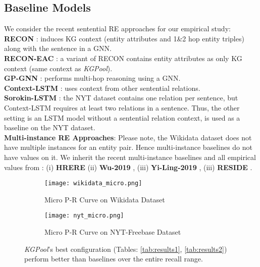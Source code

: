 \documentclass[11pt,a4paper]{article}
\begin{document}
\subsection{Baseline Models} \label{sec:baseline}
We consider the recent sentential RE approaches for our empirical study:\\
\textbf{RECON} \cite{bastos2020recon}: induces KG context (entity attributes and 1\&2 hop entity triples) along with the sentence in a GNN.\\
\textbf{RECON-EAC} \cite{bastos2020recon}: a variant of RECON contains entity attributes as only KG context (same context as \textit{KGPool}). \\
\textbf{GP-GNN} \cite{DBLP:conf/acl/ZhuLLFCS19}: performs multi-hop reasoning using a GNN.  \\
\textbf{Context-LSTM} \cite{DBLP:conf/emnlp/SorokinG17}: uses context from other sentential relations.\\
\textbf{Sorokin-LSTM} \cite{DBLP:conf/emnlp/SorokinG17}: the NYT dataset contains one relation per sentence, but Context-LSTM requires at least two relations in a sentence. Thus, the other setting is an LSTM model without a sentential relation context, is used as a baseline on the NYT dataset.\\
\textbf{Multi-instance RE Approaches}:
Please note, the Wikidata dataset does not have multiple instances for an entity pair. Hence multi-instance baselines do not have values on it. We inherit the recent multi-instance baselines and all empirical values from \cite{bastos2020recon}: (i) \textbf{HRERE} \cite{DBLP:conf/naacl/XuB19} (ii) \textbf{Wu-2019} \cite{DBLP:conf/aaai/WuFZ19}, (iii) \textbf{Yi-Ling-2019} \cite{DBLP:conf/naacl/YeL19}, (iii) \textbf{RESIDE} \cite{DBLP:conf/emnlp/VashishthJPBT18}.
\begin{figure*}
  \begin{subfigure}[b]{0.41\textwidth}
    \texttt{[image: wikidata\_micro.png]}
    \caption{Micro P-R Curve on Wikidata Dataset}
    \label{fig:1}
\end{subfigure}
\begin{subfigure}[b]{0.41\textwidth}
    \texttt{[image: nyt\_micro.png]}
    \caption{Micro P-R Curve on NYT-Freebase Dataset}
    \label{fig:2}
\end{subfigure}
  \caption{\textit{KGPool}'s best configuration (Tables: \ref{tab:results1}, \ref{tab:results2}) perform better than baselines over the entire recall range.}
  \label{fig:prcurve}
      \vspace{-3mm}
\end{figure*}
\end{document}
